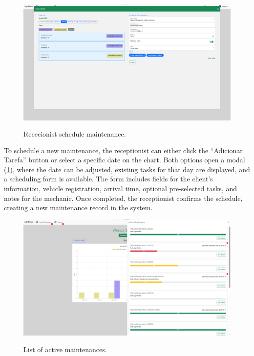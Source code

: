 

\begin{figure}[h]
  \caption{Rececionist schedule maintenance.}
  \centering
  \includegraphics[width=\textwidth]{figs/Implementation/rececionist/addTask}
  \label{fig:impReceAddTask}
\end{figure}

To schedule a new maintenance, the receptionist can either click the “Adicionar Tarefa” button or select a specific date on the chart. Both options open a modal (\ref{fig:impReceAddTask}), where the date can be adjusted, existing tasks for that day are displayed, and a scheduling form is available. The form includes fields for the client's information, vehicle registration, arrival time, optional pre-selected tasks, and notes for the mechanic. Once completed, the receptionist confirms the schedule, creating a new maintenance record in the system.

\begin{figure}[h]
  \caption{List of active maintenances.}
  \centering
  \includegraphics[width=\textwidth]{figs/Implementation/rececionist/activeMaintenances}
  \label{fig:impReceListMaint}
\end{figure}



